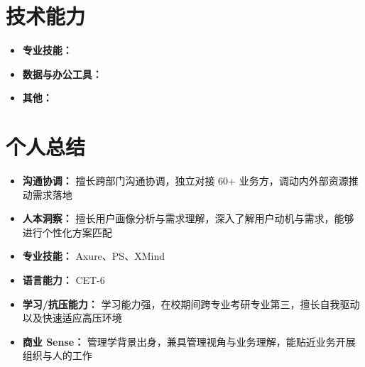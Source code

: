 \documentclass{resume}
\begin{document}
\section[技术能力]{技术能力}

\begin{itemize}
  \item \textbf{专业技能：}
  \item \textbf{数据与办公工具：}
  \item \textbf{其他：}
\end{itemize}

\section[个人总结]{个人总结}

\begin{itemize}
  \item \textbf{沟通协调：} 擅长跨部门沟通协调，独立对接 60+ 业务方，调动内外部资源推动需求落地
  \item \textbf{人本洞察：} 擅长用户画像分析与需求理解，深入了解用户动机与需求，能够进行个性化方案匹配
  \item \textbf{专业技能：} Axure、PS、XMind
  \item \textbf{语言能力：} CET-6
  \item \textbf{学习/抗压能力：} 学习能力强，在校期间跨专业考研专业第三，擅长自我驱动以及快速适应高压环境
  \item \textbf{商业 Sense：} 管理学背景出身，兼具管理视角与业务理解，能贴近业务开展组织与人的工作
\end{itemize}
\end{document}
